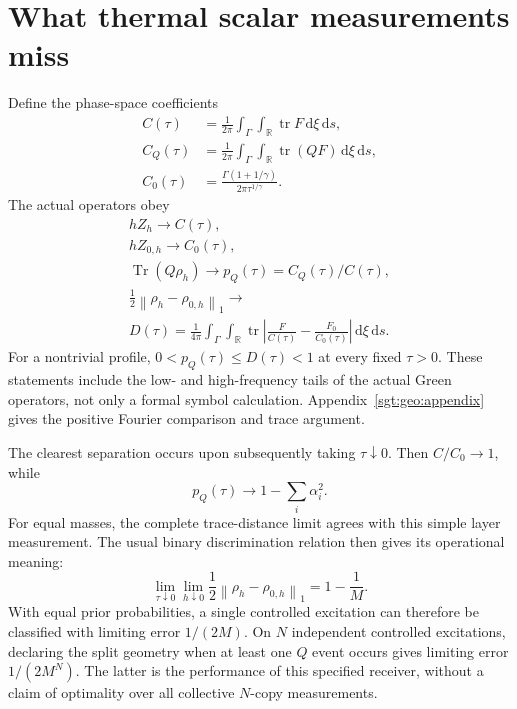 \documentclass[aps,pra,reprint,superscriptaddress,longbibliography]{revtex4-2}
\newcommand{\Tr}{\operatorname{Tr}}
\newcommand{\dd}{\mathrm d}
\newcommand{\norm}[1]{\left\lVert#1\right\rVert}
\begin{document}
\section{What thermal scalar measurements miss}
\label{sgt:main:separation}

Define the phase-space coefficients
\begin{align}
 C(\tau)&=\frac1{2\pi}\int_\Gamma\int_{\mathbb R}
                        \operatorname{tr} F\,\dd\xi\,\dd s,\nonumber\\
 C_Q(\tau)&=\frac1{2\pi}\int_\Gamma\int_{\mathbb R}
                        \operatorname{tr}(QF)\,\dd\xi\,\dd s,\nonumber\\
 C_0(\tau)&=\frac{\Gamma(1+1/\gamma)}{2\pi\tau^{1/\gamma}}.
 \label{sgt:main:C}
\end{align}
The actual operators obey
\begin{gather}
 hZ_h\longrightarrow C(\tau),\\
 hZ_{0,h}\longrightarrow C_0(\tau),\\
 \Tr(Q\rho_h)\longrightarrow p_Q(\tau)=C_Q(\tau)/C(\tau),
 \label{sgt:main:joint}\\
 \frac12\norm{\rho_h-\rho_{0,h}}_1\longrightarrow
\\
 D(\tau)=\frac1{4\pi}\int_\Gamma\int_{\mathbb R}
 \operatorname{tr}\left|\frac F{C(\tau)}-\frac{F_0}{C_0(\tau)}\right|
 \,\dd\xi\,\dd s .
 \label{sgt:main:distance}
\end{gather}
For a nontrivial profile, $0<p_Q(\tau)\le D(\tau)<1$ at every fixed
$\tau>0$. These statements include the low- and high-frequency tails
of the actual Green operators, not only a formal symbol calculation.
Appendix~\ref{sgt:geo:appendix} gives the positive Fourier comparison
and trace argument.

The clearest separation occurs upon subsequently taking $\tau\downarrow0$.
Then $C/C_0\to1$, while
\begin{equation}
 p_Q(\tau)\longrightarrow1-\sum_i\alpha_i^2.
 \label{sgt:main:Qhot}
\end{equation}
For equal masses, the complete trace-distance limit agrees with this
simple layer measurement. The usual binary discrimination relation
\cite{Watrous2018} then gives its operational meaning:
\begin{equation}
 \lim_{\tau\downarrow0}\lim_{h\downarrow0}
 \frac12\norm{\rho_h-\rho_{0,h}}_1=1-\frac1M.
 \label{sgt:main:equal}
\end{equation}
With equal prior probabilities, a single controlled excitation can
therefore be classified with limiting error $1/(2M)$. On $N$ independent
controlled excitations, declaring the split geometry when at least one
$Q$ event occurs gives limiting error $1/(2M^N)$. The latter is the
performance of this specified receiver, without a claim of optimality
over all collective $N$-copy measurements.
\end{document}
